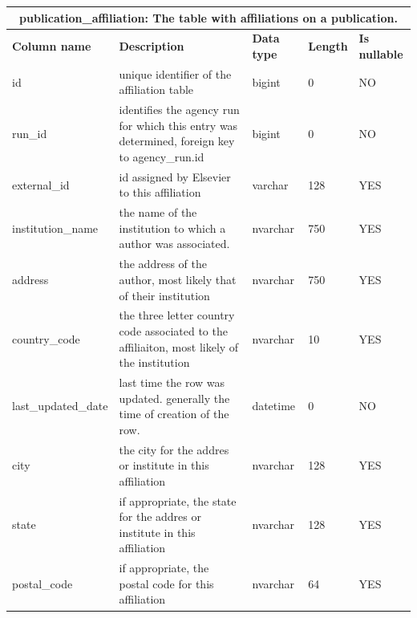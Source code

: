 \documentclass[titlepage, 11pt]{article}
\begin{document}
{\begin{table}[h!]

{\renewcommand{\arraystretch}{1.5}%
\begin{tabularx}{1\textwidth} {|p{4cm}|p{5.33cm}|p{2cm}|p{1.5cm}|p{1.5cm}|}
 \hline
 \multicolumn{5}{|c|}{\textbf{publication\_affiliation: The table with affiliations on a publication.}}\\
 \hline
 \textbf{Column name} & \textbf{Description} & \textbf{Data type} & \textbf{Length} & \textbf{Is nullable} \\
 \hline
 id & unique identifier of the affiliation table & bigint   & 0   & NO  \\
 \hline
 run\_id  & identifies the agency run for which this entry was determined, 
 foreign key to agency\_run.id & bigint   & 0  & NO  \\
 \hline
 external\_id & id assigned by Elsevier to this affiliation & varchar  & 128 & YES \\
 \hline
institution\_name & the name of the institution to which a author was associated. & nvarchar & 750 & YES \\
\hline
address & the address of the author, most likely that of their institution & nvarchar & 750 & YES \\
\hline
country\_code & the three letter country code associated to the affiliaiton, most likely of the institution  & nvarchar & 10 & YES \\
\hline
last\_updated\_date & last time the row was updated. generally the time of creation of the row.& datetime & 0  & NO  \\
\hline
city & the city for the addres or institute in this affiliation   & nvarchar & 128 & YES \\
\hline
state & if appropriate, the state for the addres or institute in this affiliation & nvarchar & 128 & YES \\
\hline
postal\_code & if appropriate, the postal code for this affiliation & nvarchar & 64  & YES \\
\hline

\end{tabularx}
\label{table: appendix b - publication affiliation}
}
\end{table}

\begin{table}[h!]


\end{table}}
\end{document}
